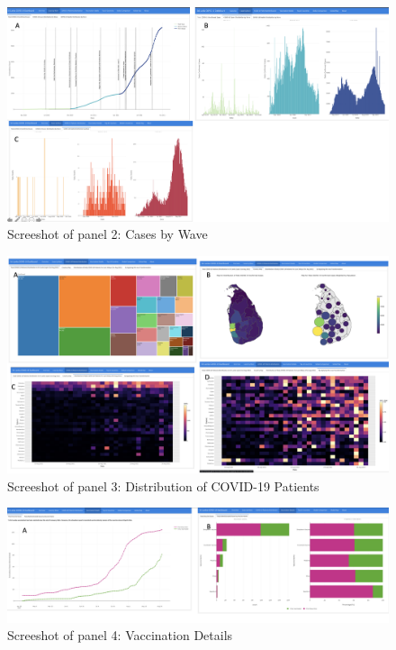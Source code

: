\documentclass[
]{article}
\begin{document}
\begin{figure}

{\centering \includegraphics[width=0.8\linewidth]{Images/image2} 

}

\caption{Screeshot of panel 2: Cases by Wave}\label{fig:unnamed-chunk-6}
\end{figure}

\begin{figure}

{\centering \includegraphics[width=0.8\linewidth]{Images/image3} 

}

\caption{Screeshot of panel 3: Distribution of COVID-19 Patients}\label{fig:unnamed-chunk-7}
\end{figure}

\begin{figure}

{\centering \includegraphics[width=0.8\linewidth]{Images/image4} 

}

\caption{Screeshot of panel 4: Vaccination Details}\label{fig:unnamed-chunk-8}
\end{figure}
\end{document}
